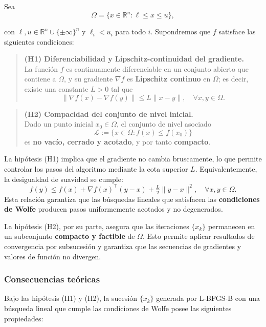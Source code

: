 \documentclass[
  spanish,
  us-letterpaper,
  DIV=11,
  numbers=noendperiod]{scrreprt}
\numberwithin{equation}{section}
\begin{document}
Sea \[
\Omega = \{ x \in \mathbb{R}^n : \ell \le x \le u \},
\]

con \(\ell, u \in \mathbb{R}^n \cup \{\pm\infty\}^n\) y \(\ell_i < u_i\)
para todo \(i\). Supondremos que \(f\) satisface las siguientes
condiciones:

\begin{quote}
\textbf{(H1) Diferenciabilidad y Lipschitz-continuidad del gradiente.}\\
La función \(f\) es continuamente diferenciable en un conjunto abierto
que contiene a \(\Omega\), y su gradiente \(\nabla f\) es
\textbf{Lipschitz continuo} en \(\Omega\); es decir, existe una
constante \(L > 0\) tal que\\
\[
\|\nabla f(x) - \nabla f(y)\| \le L \|x - y\|, \quad \forall x, y \in \Omega. \tag{3.37}
\]
\end{quote}

\begin{quote}
\textbf{(H2) Compacidad del conjunto de nivel inicial.}\\
Dado un punto inicial \(x_0 \in \Omega\), el conjunto de nivel
asociado\\
\[
\mathcal{L} := \{ x \in \Omega : f(x) \le f(x_0) \} \tag{3.38}
\] es \textbf{no vacío, cerrado y acotado}, y por tanto
\textbf{compacto}.
\end{quote}

La hipótesis (H1) implica que el gradiente no cambia bruscamente, lo que
permite controlar los pasos del algoritmo mediante la cota superior
\(L\). Equivalentemente, la desigualdad de suavidad se cumple: \[
f(y) \le f(x) + \nabla f(x)^\top (y-x) + \tfrac{L}{2}\|y-x\|^2, \quad \forall x, y \in \Omega. \tag{3.39}
\] Esta relación garantiza que las búsquedas lineales que satisfacen las
\textbf{condiciones de Wolfe} producen pasos uniformemente acotados y no
degenerados.

La hipótesis (H2), por su parte, asegura que las iteraciones \(\{x_k\}\)
permanecen en un subconjunto \textbf{compacto y factible} de \(\Omega\).
Esto permite aplicar resultados de convergencia por subsucesión y
garantiza que las secuencias de gradientes y valores de función no
divergen.

\subsubsection{Consecuencias teóricas}\label{consecuencias-teuxf3ricas}

Bajo las hipótesis (H1) y (H2), la sucesión \(\{x_k\}\) generada por
L-BFGS-B con una búsqueda lineal que cumple las condiciones de Wolfe
posee las siguientes propiedades:
\end{document}
